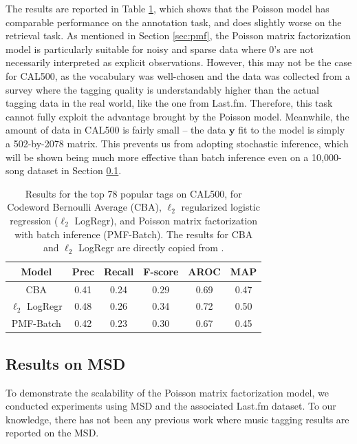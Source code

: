 The results are reported in Table \ref{tab:cal500}, which shows that the Poisson model has comparable performance on the annotation task, and does slightly worse on the retrieval task. As mentioned in Section \ref{sec:pmf}, the Poisson matrix factorization model is particularly suitable for noisy and sparse data where $0$'s are not necessarily interpreted as explicit observations. However, this may not be the case for CAL500, as the vocabulary was well-chosen and the data was collected from a survey where the tagging quality is understandably higher than the actual tagging data in the real world, like the one from Last.fm. Therefore, this task cannot fully exploit the advantage brought by the Poisson model. 
Meanwhile, the amount of data in CAL500 is fairly small -- the data $\boldsymbol{y}$ fit to the model is simply a 502-by-2078 matrix. This prevents us from adopting stochastic inference, which will  be shown being much more effective than batch inference even on a 10,000-song dataset in Section \ref{sec:msd}. 

\begin{table}
\centering
  \begin{tabular}{ c | c  c  c | c  c }
    \hline
    Model & Prec & Recall & F-score & AROC & MAP \\ \hline
      CBA &  0.41 & 0.24    &   0.29    &   0.69  & 0.47 \\
     $\ell_2$ LogRegr & 0.48  &  0.26  & 0.34  &  0.72 & 0.50\\
    PMF-Batch & 0.42  &  0.23 & 0.30 & 0.67 & 0.45 \\
    \hline
  \end{tabular}
  \caption{Results for the top 78 popular tags on CAL500, for Codeword Bernoulli Average (CBA), $\ell_2$ regularized logistic regression ($\ell_2$ LogRegr), and Poisson matrix factorization with batch inference (PMF-Batch). The results for CBA and $\ell_2$ LogRegr are directly copied from \cite{xie2011music}.} 
  \label{tab:cal500}
\end{table}


\subsection{Results on MSD}\label{sec:msd}
To demonstrate the scalability of the Poisson matrix factorization model, we conducted experiments using MSD and the associated Last.fm dataset. To our knowledge, there has not been any previous work where music tagging results are reported on the MSD. 

